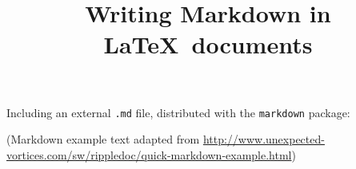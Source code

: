 \documentclass{article}
\title{Writing Markdown in \LaTeX\ documents}
\author{}
\date{}
\begin{document}
\maketitle

Including an external \texttt{.md} file, distributed with the \texttt{markdown} package:



(Markdown example text adapted from \url{http://www.unexpected-vortices.com/sw/rippledoc/quick-markdown-example.html})




\end{document}
